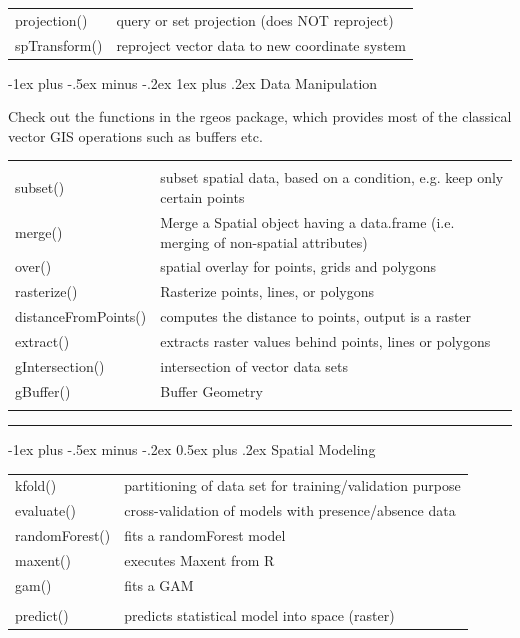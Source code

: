\documentclass[10pt,landscape]{article}
\makeatletter
\renewcommand{\section}{\@startsection{section}{1}{0mm}%
                                {-1ex plus -.5ex minus -.2ex}%
                                {0.5ex plus .2ex}%
                                {\normalfont\large\bfseries}}
\renewcommand{\subsubsection}{\@startsection{subsubsection}{3}{0mm}%
                                {-1ex plus -.5ex minus -.2ex}%
                                {1ex plus .2ex}%
                                {\normalfont\small\bfseries}}
\makeatother
\begin{document}
\begin{multicols}{3}
\begin{tabular}{@{}p{\the\MyLen}%
                @{}p{\linewidth-\the\MyLen}@{}}
projection()	  & query or set projection (does NOT reproject)\\                               
spTransform()	  & reproject vector data to new coordinate system \\
               

\end{tabular}


\subsubsection{Data Manipulation}

Check out the functions in the rgeos package, which provides most of the classical vector GIS operations such as buffers etc.\\


\begin{tabular}{@{}p{\the\MyLen}%
                @{}p{\linewidth-\the\MyLen}@{}}
                & \\
subset()		& subset spatial data, based on a condition, e.g. keep only certain points \\                
merge() 		& Merge a Spatial object having a data.frame (i.e. merging of non-spatial attributes)\\
over()			& spatial overlay for points, grids and polygons \\
rasterize() 		& Rasterize points, lines, or polygons\\ 
distanceFromPoints()    & computes the distance to points, output is a raster\\
extract()		& extracts raster values behind points, lines or polygons \\
gIntersection()		& intersection of vector data sets \\
gBuffer()		& Buffer Geometry \\
 & 
\end{tabular}


\rule{0.32\textwidth}{0.4pt}



\section{Spatial Modeling}

\begin{tabular}{@{}p{\the\MyLen}%
                @{}p{\linewidth-\the\MyLen}@{}}
kfold() & partitioning of data set for training/validation purpose\\
evaluate() & cross-validation of models with presence/absence data\\               
randomForest() & fits a randomForest model  \\
maxent() & executes Maxent from R\\
gam() & fits a GAM \\
 &  \\                
predict() & predicts statistical model into space (raster) \\


\end{tabular}
\end{multicols}
\end{document}
